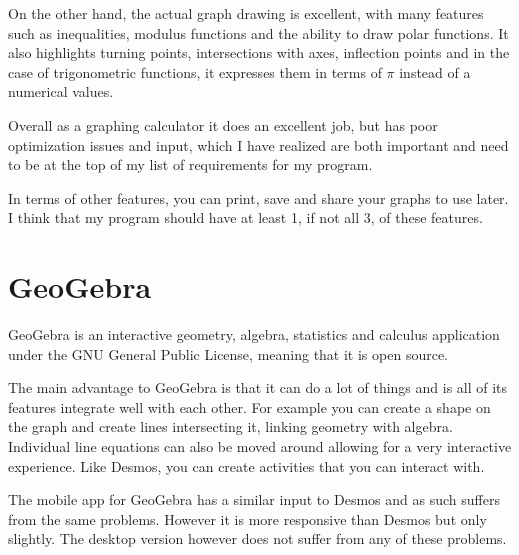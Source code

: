 \documentclass[../../../main.tex]{subfiles}
\begin{document}
On the other hand, the actual graph drawing is excellent, with many features such as inequalities, modulus functions and the ability to draw polar functions. It also highlights turning points, intersections with axes, inflection points and in the case of trigonometric functions, it expresses them in terms of $\pi$ instead of a numerical values.

Overall as a graphing calculator it does an excellent job, but has poor optimization issues and input, which I have realized are both important and need to be at the top of my list of requirements for my program.

In terms of other features, you can print, save and share your graphs to use later. I think that my program should have at least 1, if not all 3, of these features.

\section{GeoGebra}
GeoGebra is an interactive geometry, algebra, statistics and calculus application under the GNU General Public License, meaning that it is open source.

The main advantage to GeoGebra is that it can do a lot of things and is all of its features integrate well with each other. For example you can create a shape on the graph and create lines intersecting it, linking geometry with algebra. Individual line equations can also be moved around allowing for a very interactive experience. Like Desmos, you can create activities that you can interact with.

The mobile app for GeoGebra has a similar input to Desmos and as such suffers from the same problems. However it is more responsive than Desmos but only slightly. The desktop version however does not suffer from any of these problems.
\end{document}
